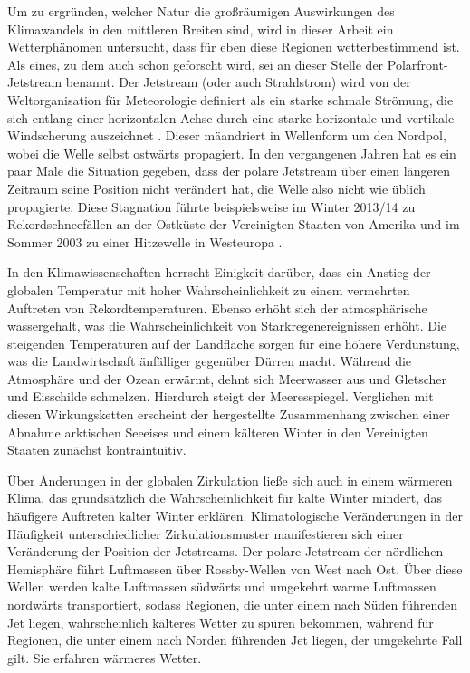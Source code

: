 Um zu ergründen, welcher Natur die großräumigen Auswirkungen des Klimawandels in den mittleren Breiten sind, wird in dieser Arbeit ein Wetterphänomen untersucht, dass für eben diese Regionen wetterbestimmend ist. Als eines, zu dem auch schon geforscht wird, sei an dieser Stelle der Polarfront-Jetstream benannt. Der Jetstream (oder auch Strahlstrom) wird von der Weltorganisation für Meteorologie definiert als ein starke schmale Strömung, die sich entlang einer horizontalen Achse durch eine starke horizontale und vertikale Windscherung auszeichnet \citep{wmo-1958}. Dieser mäandriert in Wellenform um den Nordpol, wobei die Welle selbst ostwärts propagiert. In den vergangenen Jahren hat es ein paar Male die Situation gegeben, dass der polare Jetstream über einen längeren Zeitraum seine Position nicht verändert hat, die Welle also nicht wie üblich propagierte. Diese Stagnation führte beispielsweise im Winter 2013/14 zu Rekordschneefällen an der Ostküste der Vereinigten Staaten von Amerika \citep{palmer-2014} und im Sommer 2003 zu einer Hitzewelle in Westeuropa \citep{petoukhov-2013}.

In den Klimawissenschaften herrscht Einigkeit darüber, dass ein Anstieg der globalen Temperatur mit hoher Wahrscheinlichkeit zu einem vermehrten Auftreten von Rekordtemperaturen. Ebenso erhöht sich der atmosphärische wassergehalt, was die Wahrscheinlichkeit von Starkregenereignissen erhöht. Die steigenden Temperaturen auf der Landfläche sorgen für eine höhere Verdunstung, was die Landwirtschaft änfälliger gegenüber Dürren macht. Während die Atmosphäre und der Ozean erwärmt, dehnt sich Meerwasser aus und Gletscher und Eisschilde schmelzen. Hierdurch steigt der Meeresspiegel. Verglichen mit diesen Wirkungsketten erscheint der hergestellte Zusammenhang zwischen einer Abnahme arktischen Seeeises und einem kälteren Winter in den Vereinigten Staaten zunächst kontraintuitiv. \citep{wallace-2014}

Über Änderungen in der globalen Zirkulation ließe sich auch in einem wärmeren Klima, das grundsätzlich die Wahrscheinlichkeit für kalte Winter mindert, das häufigere Auftreten kalter Winter erklären. Klimatologische Veränderungen in der Häufigkeit unterschiedlicher Zirkulationsmuster manifestieren sich einer Veränderung der Position der Jetstreams. Der polare Jetstream der nördlichen Hemisphäre führt Luftmassen über Rossby-Wellen von West nach Ost. Über diese Wellen werden kalte Luftmassen südwärts und umgekehrt warme Luftmassen nordwärts transportiert, sodass Regionen, die unter einem nach Süden führenden Jet liegen, wahrscheinlich kälteres Wetter zu spüren bekommen, während für Regionen, die unter einem nach Norden führenden Jet liegen, der umgekehrte Fall gilt. Sie erfahren wärmeres  Wetter. \citep{palmer-2014}

